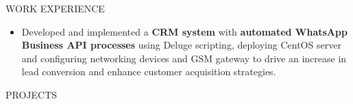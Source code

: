 \documentclass{resume} %
\begin{document}
\begin{rSection}{WORK EXPERIENCE}
\begin{itemize}
              \item Developed and implemented a \textbf{CRM system} with \textbf{automated WhatsApp Business API processes} using Deluge scripting, deploying CentOS server and configuring networking devices and GSM gateway to drive an increase in lead conversion and enhance customer acquisition strategies.
    \end{itemize}
\end{rSection}


\begin{rSection}{PROJECTS}
    \vspace{-1.25em}



\end{rSection}
\end{document}
